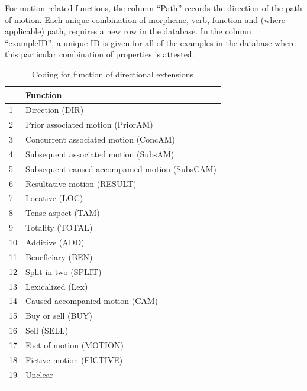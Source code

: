 For motion-related functions, the column ``Path'' records the direction of the path of motion. Each unique combination of morpheme, verb, function and (where applicable) path, requires a new row in the database. In the column ``exampleID'', a unique ID is given for all of the examples in the database where this particular combination of properties is attested. 

	
	\begin{table}[t]
		\caption{Coding for function of directional extensions}
		\label{tab:code}
		\begin{tabular}{ll} %
			\lsptoprule
			{} & Function   \\ %
			\midrule
			1 &	Direction (DIR)     \\		\midrule
			2 & Prior associated motion (PriorAM) \\
			3 & Concurrent associated motion (ConcAM) \\
			4 &  Subsequent associated motion (SubsAM) \\
			5 &  Subsequent caused accompanied motion (SubsCAM) \\
			6 & Resultative motion (RESULT) \\ \midrule
			7 & Locative (LOC)  	\\ 	\midrule
			8 & Tense-aspect (TAM) \\
			9 & Totality (TOTAL) \\
			10 & Additive (ADD) \\
			11 & Beneficiary (BEN) \\
			12 & Split in two (SPLIT) \\ \midrule
			13 & Lexicalized (Lex) \\
			14	& Caused accompanied motion (CAM) \\
			15 & Buy or sell (BUY) \\
			16  & Sell (SELL) \\
			17 & Fact of motion (MOTION) \\  \midrule
			18 & Fictive motion (FICTIVE)  \\ 
			19 & Unclear \\
			\lspbottomrule
		\end{tabular}
	\end{table}
	
	
